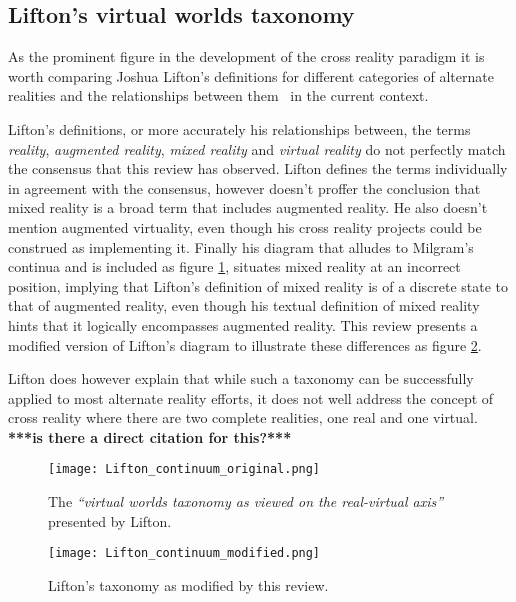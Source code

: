 \subsection{Lifton's virtual worlds taxonomy}

As the prominent figure in the development of the cross reality paradigm it is worth comparing Joshua Lifton's definitions for different categories of alternate realities and the relationships between them~\cite{Lifton2007a} in the current context.

Lifton's definitions, or more accurately his relationships between, the terms \textit{reality}, \textit{augmented reality}, \textit{mixed reality} and \textit{virtual reality} do not perfectly match the consensus that this review has observed. Lifton defines the terms individually in agreement with the consensus, however doesn't proffer the conclusion that mixed reality is a broad term that includes augmented reality. He also doesn't mention augmented virtuality, even though his cross reality projects could be construed as implementing it. Finally his diagram that alludes to Milgram's continua and is included as figure \ref{original_lifton_axis.png}, situates mixed reality at an incorrect position, implying that Lifton's definition of mixed reality is of a discrete state to that of augmented reality, even though his textual definition of mixed reality hints that it logically encompasses augmented reality. This review presents a modified version of Lifton's diagram to illustrate these differences as figure \ref{modified_lifton_axis.png}.

Lifton does however explain that while such a taxonomy can be successfully applied to most alternate reality efforts, it does not well address the concept of cross reality where there are two complete realities, one real and one virtual. \textbf{***is there a direct citation for this?***}

\begin{figure}[h]
	\centering
	\texttt{[image: Lifton\_continuum\_original.png]}
	\caption{The \textit{``virtual worlds taxonomy as viewed on the real-virtual axis''} presented by Lifton.}
	\label{original_lifton_axis.png}
\end{figure}

\begin{figure}[h]
	\centering
	\texttt{[image: Lifton\_continuum\_modified.png]}
	\caption{Lifton's taxonomy as modified by this review.}
	\label{modified_lifton_axis.png}
\end{figure}

